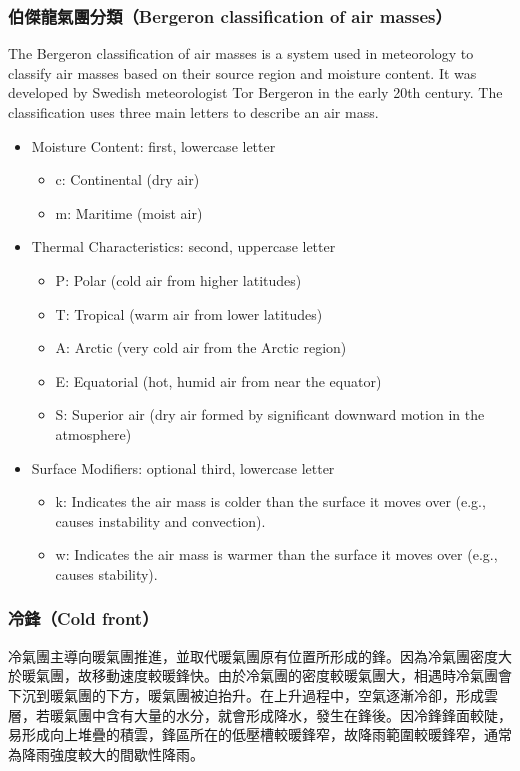 \documentclass[a4paper,12pt]{report}
\begin{document}
\begin{itemize}
\subsubsection{伯傑龍氣團分類（Bergeron classification of air masses）}
The Bergeron classification of air masses is a system used in meteorology to classify air masses based on their source region and moisture content. It was developed by Swedish meteorologist Tor Bergeron in the early 20th century. The classification uses three main letters to describe an air mass.
\begin{itemize}
\item Moisture Content: first, lowercase letter
\begin{itemize}
\item c: Continental (dry air)
\item m: Maritime (moist air)
\end{itemize}
\item Thermal Characteristics: second, uppercase letter
\begin{itemize}
\item P: Polar (cold air from higher latitudes)
\item T: Tropical (warm air from lower latitudes)
\item A: Arctic (very cold air from the Arctic region)
\item E: Equatorial (hot, humid air from near the equator)
\item S: Superior air (dry air formed by significant downward motion in the atmosphere)
\end{itemize}
\item Surface Modifiers: optional third, lowercase letter
\begin{itemize}
\item k: Indicates the air mass is colder than the surface it moves over (e.g., causes instability and convection).
\item w: Indicates the air mass is warmer than the surface it moves over (e.g., causes stability).
\end{itemize}
\end{itemize}
\subsubsection{冷鋒（Cold front）}
冷氣團主導向暖氣團推進，並取代暖氣團原有位置所形成的鋒。因為冷氣團密度大於暖氣團，故移動速度較暖鋒快。由於冷氣團的密度較暖氣團大，相遇時冷氣團會下沉到暖氣團的下方，暖氣團被迫抬升。在上升過程中，空氣逐漸冷卻，形成雲層，若暖氣團中含有大量的水分，就會形成降水，發生在鋒後。因冷鋒鋒面較陡，易形成向上堆疊的積雲，鋒區所在的低壓槽較暖鋒窄，故降雨範圍較暖鋒窄，通常為降雨強度較大的間歇性降雨。


\end{itemize}
\end{document}
